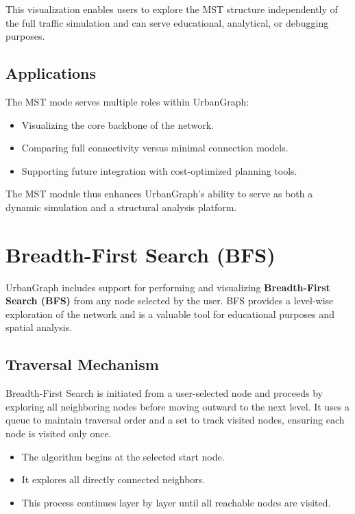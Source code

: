 \documentclass[12pt]{article}
\begin{document}
This visualization enables users to explore the MST structure independently of the full traffic simulation and can serve educational, analytical, or debugging purposes.

\subsection*{Applications}

The MST mode serves multiple roles within UrbanGraph:
\begin{itemize}
    \item Visualizing the core backbone of the network.
    \item Comparing full connectivity versus minimal connection models.
    \item Supporting future integration with cost-optimized planning tools.
\end{itemize}

The MST module thus enhances UrbanGraph’s ability to serve as both a dynamic simulation and a structural analysis platform.

\section{Breadth-First Search (BFS)}

UrbanGraph includes support for performing and visualizing \textbf{Breadth-First Search (BFS)} from any node selected by the user. BFS provides a level-wise exploration of the network and is a valuable tool for educational purposes and spatial analysis.

\subsection*{Traversal Mechanism}

Breadth-First Search is initiated from a user-selected node and proceeds by exploring all neighboring nodes before moving outward to the next level. It uses a queue to maintain traversal order and a set to track visited nodes, ensuring each node is visited only once.

\begin{itemize}
    \item The algorithm begins at the selected start node.
    \item It explores all directly connected neighbors.
    \item This process continues layer by layer until all reachable nodes are visited.
\end{itemize}
\end{document}

